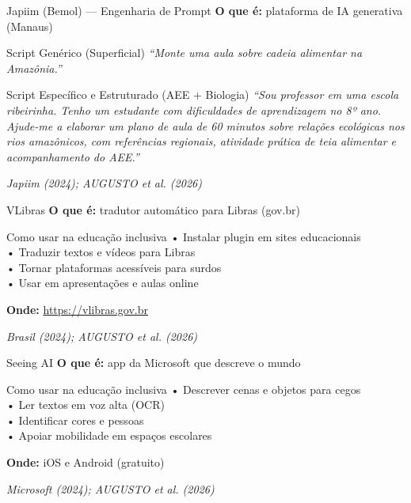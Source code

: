 \documentclass[11pt]{beamer}
\newcommand{\citabnt}[1]{%
	\vfill
	\begin{flushright}
		\tiny\textit{#1}
	\end{flushright}
}
\begin{document}
	\begin{frame}{Japiim (Bemol) — Engenharia de Prompt}
		\textbf{O que é:} plataforma de IA generativa (Manaus)
		\vspace{0.4em}
		\begin{block}{Script Genérico (Superficial)}
			\small
			\textit{``Monte uma aula sobre cadeia alimentar na Amazônia.''}
		\end{block}
		
		\vspace{0.3em}
		\begin{block}{Script Específico e Estruturado (AEE + Biologia)}
			\justifying
			\small
			\textit{``Sou professor em uma escola ribeirinha. Tenho um estudante com dificuldades de aprendizagem no 8º ano. Ajude-me a elaborar um plano de aula de 60 minutos sobre relações ecológicas nos rios amazônicos, com referências regionais, atividade prática de teia alimentar e acompanhamento do AEE.''}
		\end{block}
		\citabnt{Japiim (2024); AUGUSTO et al. (2026)}
	\end{frame}
	
	\begin{frame}{VLibras}
		\textbf{O que é:} tradutor automático para Libras (gov.br)
		\vspace{0.5em}
		\begin{block}{Como usar na educação inclusiva}
			\small
			• Instalar plugin em sites educacionais\\
			• Traduzir textos e vídeos para Libras\\
			• Tornar plataformas acessíveis para surdos\\
			• Usar em apresentações e aulas online
		\end{block}
		\textbf{Onde:} \url{https://vlibras.gov.br}
		\citabnt{Brasil (2024); AUGUSTO et al. (2026)}
	\end{frame}
	
	\begin{frame}{Seeing AI}
		\textbf{O que é:} app da Microsoft que descreve o mundo
		\vspace{0.5em}
		\begin{block}{Como usar na educação inclusiva}
			\small
			• Descrever cenas e objetos para cegos\\
			• Ler textos em voz alta (OCR)\\
			• Identificar cores e pessoas\\
			• Apoiar mobilidade em espaços escolares
		\end{block}
		\textbf{Onde:} iOS e Android (gratuito)
		\citabnt{Microsoft (2024); AUGUSTO et al. (2026)}
	\end{frame}
	
\end{document}
